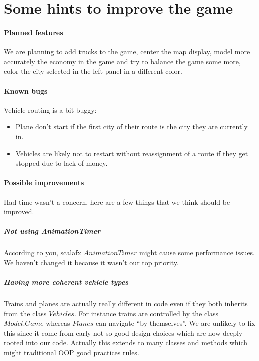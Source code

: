 \documentclass[a4paper]{article}
\begin{document}
	\section{Some hints to improve the game}
	\paragraph{Planned features}
	We are planning to add trucks to the game, center the map display, model more accurately the economy in the game and try to balance the game some more, color the city selected in the left panel in a different color.

	\paragraph{Known bugs}
	Vehicle routing is a bit buggy:
	\begin{itemize}
		\item Plane don't start if the first city of their route is the city they are currently in.
		\item Vehicles are likely not to restart without reassignment of a route if they get stopped due to lack of money.
	\end{itemize}

	\paragraph{Possible improvements} Had time wasn't a concern, here are a few things that we think should be improved.
	\subparagraph{Not using AnimationTimer} According to you, scalafx $AnimationTimer$ might cause some performance issues. We haven't changed it because it wasn't our top priority.
	\subparagraph{Having more coherent vehicle types}
	Trains and planes are actually really different in code even if they both inherits from the class $Vehicles$. For instance trains are controlled by the class $Model.Game$ whereas $Planes$ can navigate ``by themselves''. We are unlikely to fix this since it come from early not-so good design choices which are now deeply-rooted into our code. Actually this extends to many classes and methods which might traditional OOP good practices rules.
\end{document}
